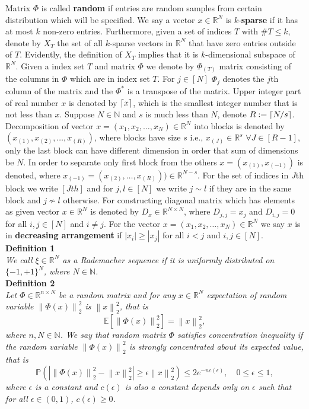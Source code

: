 \documentclass[twoside,11pt]{article}
\newcommand\norm[1]{\left\lVert#1\right\rVert}
\newcommand*\by{{\times}}
\DeclarePairedDelimiter\ceil{\lceil}{\rceil}
\begin{document}
Matrix $\Phi$ is called \textbf{random} if entries are random samples from certain distribution which will be specified. We say a vector $x \in \mathbb{R}^N$ is $k$-\textbf{sparse} if it has at most $k$ non-zero entries. Furthermore, given a set of indices $T$ with $\#T \leq k$, denote by $X_T$ the set of all $k$-sparse vectors in $\mathbb{R}^N$ that have zero entries outside of $T$. Evidently, the definition of $X_T$ implies that it is $k$-dimensional subspace of $\mathbb{R}^N$. Given a index set $T$ and matrix $\Phi$ we denote by $\Phi_{(T)}$ matrix consisting of the columns in $\Phi$ which are in index set $T$. For $j \in [N]$ $\Phi_j$ denotes the $j$th column of the matrix and the $\Phi^*$ is a  transpose of the matrix. Upper integer part of real number $x$ is denoted by $\ceil{x}$, which is the smallest integer number that is not less than $x$. Suppose $N \in \mathbb{N}$ and $s$ is much less than $N$, denote $R := \ceil{N/s}$. Decomposition of vector $x = (x_1, x_2, \dots, x_N) \in  \mathbb{R}^N$ into blocks is denoted by $(x_{(1)}, x_{(2)}, \dots, x_{(R)})$, where blocks have size $s$ i.e., $x_{(J)} \in \mathbb{R}^s$ $\forall J \in [R-1]$, only the last block can have different dimension in order that sum of dimensions be $N$. In order to separate only first block from the others $x = (x_{(1)}, x_{(-1)})$ is denoted, where $x_{(-1)} = (x_{(2)}, \dots, x_{(R)})) \in \mathbb{R}^{N-s}$. For the set of indices in $J$th block we write $[Jth]$ and for $j,l \in [N]$ we write $j \sim l$ if they are in the same block and $j \not \sim l$ otherwise. For constructing diagonal matrix which has elements as given vector $x \in \mathbb{R}^N$ is denoted by $D_x \in \mathbb{R}^{N \by N}$, where $D_{j,j} = x_j$ and $D_{i,j} = 0$ for all $i,j \in [N]$ and $i \not = j$. For the vector $x = (x_1, x_2, \dots, x_N) \in \mathbb{R}^N$ we say $x$ is in \textbf{decreasing arrangement} if $|x_i| \geq |x_j|$ for all $i < j$ and $i, j \in [N]$. \\

\noindent
{\bf Definition 1} \\
{\it We call $\xi \in \mathbb{R}^N$ as a Rademacher sequence if it is uniformly distributed on $\{-1, +1\}^N$, where $N \in \mathbb{N}$. } \\

\noindent
{\bf Definition 2} \\
{\it Let $\Phi \in \mathbb{R}^{n \by N}$ be a random matrix and for any $x \in \mathbb{R}^N$ expectation of random variable $\norm{\Phi(x)}_2^2$ is $\norm{x}_2^2$, that is 
$$
\mathbb{E}[\norm{\Phi(x)}_2^2] = \norm{x}_2^2,
$$
where $n, N \in \mathbb{N}$. We say that random matrix $\Phi$ satisfies concentration inequality if the random variable $\norm{\Phi(x)}_2^2$ is strongly concentrated about its expected value, that is
$$
\mathbb{P}(|\norm{\Phi(x)}_2^2 - \norm{x}_2^2| \geq \epsilon\norm{x}_2^2) \leq 2e^{-nc(\epsilon)}, \quad 0 \le \epsilon \le 1, 
$$
where $\epsilon$ is a constant and $c(\epsilon)$ is also a constant depends only on $\epsilon$ such that for all $\epsilon \in (0, 1)$, $c(\epsilon) \ge 0$.
} \\
\end{document}
